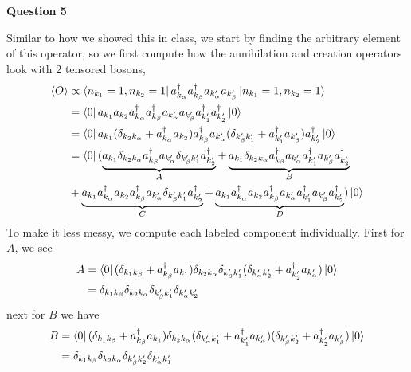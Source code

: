 \documentclass[10pt]{article}
\newcommand{\ak}[1]{a_{k_{#1}}}
\newcommand{\akp}[1]{a_{k_{#1}'}}
\begin{document}
\textbf{Question 5}

Similar to how we showed this in class, we start by finding the arbitrary element of this operator, so we first compute how the annihilation and creation operators look with 2 tensored bosons,
\begin{equation*}
  \begin{split}
    \langle O \rangle & \propto \bra{n_{k_{1}} = 1, n_{k_{2}} = 1}a_{k_{\alpha}}^{\dagger}a_{k_{\beta}}^{\dagger}a_{k'_{\alpha}}a_{k'_{\beta}}\ket{n_{k_{1}} = 1, n_{k_{2}} = 1} \\
    & = \bra{0}\ak{1}\ak{2}\ak{\alpha}^{\dagger}\ak{\beta}^{\dagger}\akp{\alpha}\akp{\beta}\akp{1}^{\dagger}\akp{2}^{\dagger}\ket{0} \\
    & = \bra{0}\ak{1}(\delta_{k_{2}k_{\alpha}} + \ak{\alpha}^{\dagger}\ak{2})\ak{\beta}^{\dagger}\akp{\alpha}(\delta_{k_{\beta}'k'_{1}} + \akp{1}^{\dagger}\akp{\beta})\akp{2}^{\dagger}\ket{0} \\
    & = \bra{0}(\underbrace{\ak{1}\delta_{k_{2}k_{\alpha}}\ak{\beta}^{\dagger}\akp{\alpha}\delta_{k_{\beta}'k'_{1}}\akp{2}^{\dagger}}_{A} + \underbrace{\ak{1}\delta_{k_{2}k_{\alpha}}\ak{\beta}^{\dagger}\akp{\alpha}\akp{1}^{\dagger}\akp{\beta}\akp{2}^{\dagger}}_{B} \\
    & + \underbrace{\ak{1}\ak{\alpha}^{\dagger}\ak{2}\ak{\beta}^{\dagger}\akp{\alpha}\delta_{k_{\beta}'k'_{1}}\akp{2}^{\dagger}}_{C} + \underbrace{\ak{1}\ak{\alpha}^{\dagger}\ak{2}\ak{\beta}^{\dagger}\akp{\alpha}\akp{1}^{\dagger}\akp{\beta}\akp{2}^{\dagger}}_{D})\ket{0} \\
  \end{split}
\end{equation*}
To make it less messy, we compute each labeled component individually. First for $A$, we see
\begin{equation*}
  \begin{split}
    A & = \bra{0}(\delta_{k_{1}k_{\beta}} + \ak{\beta}^{\dagger}\ak{1})\delta_{k_{2}k_{\alpha}}\delta_{k_{\beta}'k'_{1}}(\delta_{k'_{\alpha}k'_{2}} + \akp{2}^{\dagger}\akp{\alpha})\ket{0} \\
    & = \delta_{k_{1}k_{\beta}}\delta_{k_{2}k_{\alpha}}\delta_{k_{\beta}'k_{1}'}\delta_{k_{\alpha}'k_{2}'} \\
  \end{split}
\end{equation*}
next for $B$ we have
\begin{equation*}
  \begin{split}
    B & = \bra{0}(\delta_{k_{1}k_{\beta}} + \ak{\beta}^{\dagger}\ak{1})\delta_{k_{2}k_{\alpha}}(\delta_{k'_{\alpha}k'_{1}} + \akp{1}^{\dagger}\akp{\alpha})(\delta_{k_{\beta}'k_{2}'} + \akp{2}^{\dagger}\akp{\beta})\ket{0} \\
    & = \delta_{k_{1}k_{\beta}}\delta_{k_{2}k_{\alpha}}\delta_{k_{\beta}'k'_{2}}\delta_{k'_{\alpha}k'_{1}} \\
  \end{split}
\end{equation*}
\end{document}
